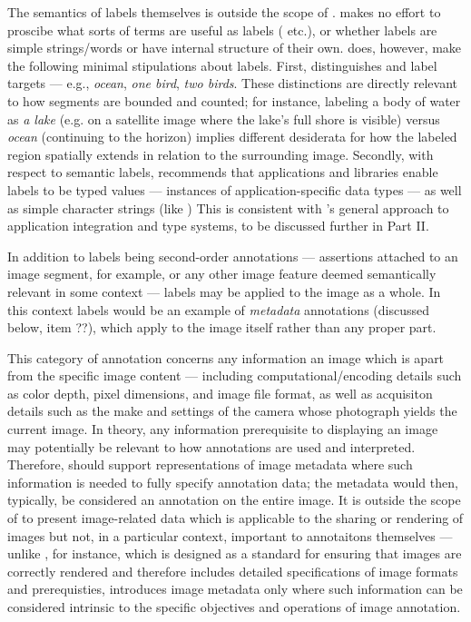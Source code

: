 {\begin{description}
The semantics of labels themselves is outside 
the scope of \AXFI{}.  \lAXFI{} makes no effort 
to proscibe what sorts of terms are useful 
as labels (   
 etc.), or whether labels are 
simple strings/words or have internal structure 
of their own.  \lAXFI{} does, however, 
make the following minimal stipulations about 
labels.  First, \AXFI{} distinguishes 
  and  label 
targets --- e.g., \textit{ocean}, \textit{one bird}, 
\textit{two birds}.  These distinctions are 
directly relevant to how segments are bounded and 
counted; for instance, labeling a body of water 
as \textit{a lake} (e.g. on a satellite image where 
the lake's full shore is visible) versus \textit{ocean} 
(continuing to the horizon) implies different 
desiderata for how the labeled region spatially extends 
in relation to the surrounding image.  Secondly, 
with respect to semantic labels, \AXFI{} recommends 
that applications and libraries enable 
labels to be typed values --- instances of 
application-specific data types --- as well 
as simple character strings (like )  
This is consistent with \AXFI{}'s general 
approach to application integration and 
type systems, to be discussed further in 
Part II. 

In addition to labels being second-order annotations 
--- assertions attached to an image segment, 
for example, or any other image feature deemed 
semantically relevant in some context --- labels 
may be applied to the image as a whole.  In this
context labels would be an example of 
\textit{metadata} annotations (discussed below, 
item ??), which apply to the image itself 
rather than any proper part. 


\item[Image Metadata]   This category 
of annotation concerns any information 
 an image which is apart from 
the specific image content --- including 
computational/encoding details such 
as color depth, pixel dimensions, and image 
file format, as well as acquisiton details 
such as the make and settings of the camera 
whose photograph yields the current image.  
In theory, any information prerequisite to 
displaying an image may potentially 
be relevant to how annotations are 
used and interpreted.  Therefore, 
\AXFI{} should support representations of 
image metadata where such information is needed 
to fully specify annotation data; the metadata 
would then, typically, be considered an 
annotation on the entire image.  It is 
outside the scope of \AXFI{} to present 
image-related data which is applicable  
to the sharing or rendering of images but 
not, in a particular context, important to 
annotaitons themselves --- unlike \DICOM{}, 
for instance, which is designed as a 
standard for ensuring that images are correctly 
rendered and therefore includes detailed 
specifications of image formats and 
prerequisties, \AXFI{} introduces 
image metadata only where such information 
can be considered intrinsic to the 
specific objectives and operations of image 
annotation.  


\end{description}}
